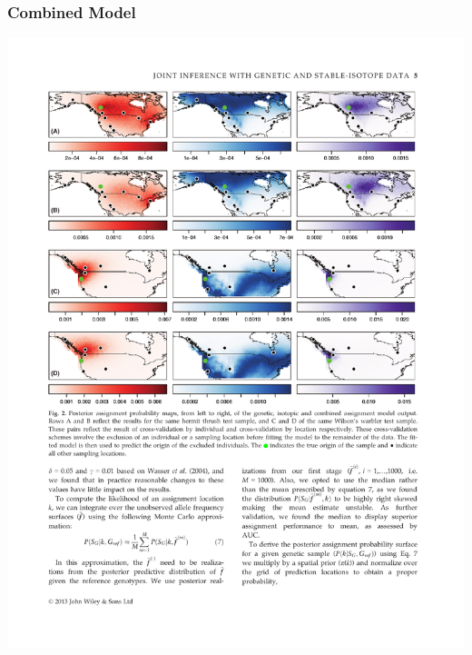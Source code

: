 \documentclass[t]{beamer}\usepackage[]{graphicx}\usepackage[]{color}
\begin{document}
\begin{frame}
\frametitle{Combined Model}

\vfill

\begin{center}
\includegraphics[width=\textwidth]{figs/hermit_maps.pdf}
\end{center}

\vfill

\end{frame}

\end{document}
